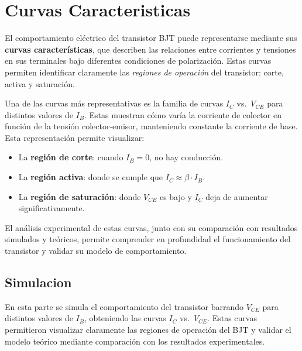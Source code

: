 \chapter{Curvas Caracteristicas}
  El comportamiento eléctrico del transistor BJT puede representarse mediante sus \textbf{curvas características}, que
  describen las relaciones entre corrientes y tensiones en sus terminales bajo diferentes condiciones de polarización.
  Estas curvas permiten identificar claramente las \textit{regiones de operación} del transistor: corte, activa y
  saturación.
    
  Una de las curvas más representativas es la familia de curvas $I_C$ vs.\ $V_{CE}$ para distintos valores de $I_B$.
  Estas muestran cómo varía la corriente de colector en función de la tensión colector-emisor, manteniendo constante la
  corriente de base. Esta representación permite visualizar:
    
  \begin{itemize}
      \item La \textbf{región de corte}: cuando $I_B = 0$, no hay conducción.
      \item La \textbf{región activa}: donde se cumple que $I_C \approx \beta \cdot I_B$.
      \item La \textbf{región de saturación}: donde $V_{CE}$ es bajo y $I_C$ deja de aumentar significativamente.
  \end{itemize}
  
  El análisis experimental de estas curvas, junto con su comparación con resultados simulados y teóricos, permite
  comprender en profundidad el funcionamiento del transistor y validar su modelo de comportamiento.

  \section{Simulacion}
    En esta parte se simula el comportamiento del transistor barrando $V_{CE}$ para distintos valores de $I_B$,
    obteniendo las curvas $I_C$ vs.\ $V_{CE}$. Estas curvas permitieron visualizar claramente las regiones de operación
    del BJT y validar el modelo teórico mediante comparación con los resultados experimentales.

